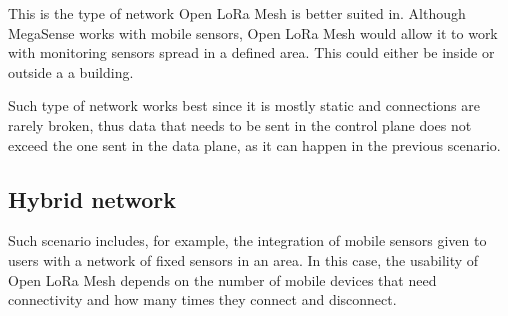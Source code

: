 			This is the type of network Open LoRa Mesh is better suited in.
			Although MegaSense works with mobile sensors, Open LoRa Mesh would allow it to work with monitoring sensors spread in a defined area.
			This could either be inside or outside a a building.
			
			Such type of network works best since it is mostly static and connections are rarely broken, thus data that needs to be sent in the control plane does not exceed the one sent in the data plane, as it can happen in the previous scenario.
		
		\subsection{Hybrid network}
		
			Such scenario includes, for example, the integration of mobile sensors given to users with a network of fixed sensors in an area.
			In this case, the usability of Open LoRa Mesh depends on the number of mobile devices that need connectivity and how many times they connect and disconnect.
			